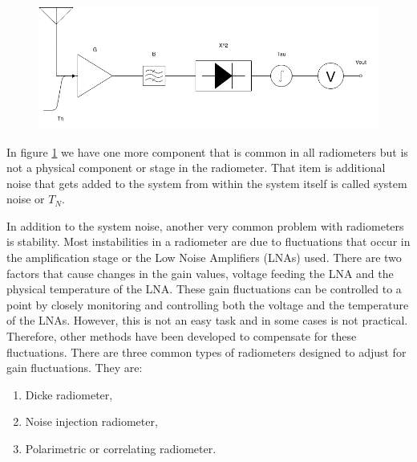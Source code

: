 {\begin{figure}[h!tb] 
\centering
\includegraphics[width=\textwidth]{Images/Radiometer.png}
\label{trad_radiometer}
\end{figure}
}

In figure \ref{trad_radiometer} we have one more component that is common in all radiometers but is not a physical component or stage in the radiometer.  That item is additional noise that gets added to the system from within the system itself is called system noise or $T_{N}$.

In addition to the system noise, another very common problem with radiometers is stability.  Most instabilities in a radiometer are due to fluctuations that occur in the amplification stage or the Low Noise Amplifiers (LNAs) used. There are two factors that cause changes in the gain values, voltage feeding the LNA and the physical temperature of the LNA.  These gain fluctuations can be controlled to a point by closely monitoring and controlling both the voltage and the temperature of the LNAs. However, this is not an easy task and in some cases is not practical.  Therefore, other methods have been developed to compensate for these fluctuations.  There are three common types of radiometers designed to adjust for gain fluctuations.  They are:

\begin{enumerate}
\item Dicke radiometer,
\item Noise injection radiometer,
\item Polarimetric or correlating radiometer.
\end{enumerate}


